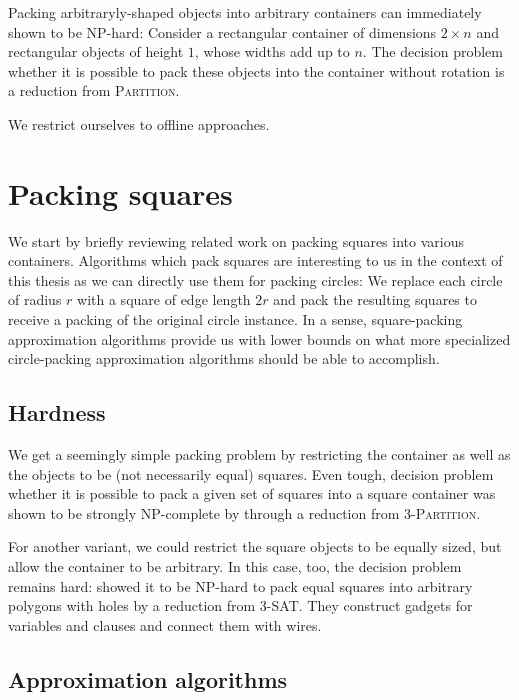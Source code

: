 \documentclass[a4paper,style=print,bibliography=totoc,nexus,lnum,extramargin]{tubsbook}
\begin{document}
Packing arbitraryly-shaped objects into arbitrary containers can immediately shown to be NP-hard: Consider a rectangular container of dimensions $2 \times n$ and rectangular objects of height $1$, whose widths add up to $n$. The decision problem whether it is possible to pack these objects into the container without rotation is a reduction from \textsc{Partition}.

We restrict ourselves to offline approaches.

\section{Packing squares}\label{sec:related-squares}

We start by briefly reviewing related work on packing squares into various containers.
Algorithms which pack squares are interesting to us in the context of this thesis as we can directly use them for packing circles: We replace each circle of radius $r$ with a square of edge length $2r$ and pack the resulting squares to receive a packing of the original circle instance. In a sense, square-packing approximation algorithms provide us with lower bounds on what more specialized circle-packing approximation algorithms should be able to accomplish.

\subsection{Hardness}

We get a seemingly simple packing problem by restricting the container as well as the objects to be (not necessarily equal) squares.
Even tough, decision problem whether it is possible to pack a given set of squares into a square container was shown to be strongly NP-complete by \textcite{LTWYC1990packing} through a reduction from \textsc{3-Partition}.

For another variant, we could restrict the square objects to be equally sized, but allow the container to be arbitrary.
In this case, too, the decision problem remains hard:
\textcite{FPT1981optimal} showed it to be NP-hard to pack equal squares into arbitrary polygons with holes by a reduction from \textsc{3-SAT}. They construct gadgets for variables and clauses and connect them with wires.%

\subsection{Approximation algorithms}
\end{document}
